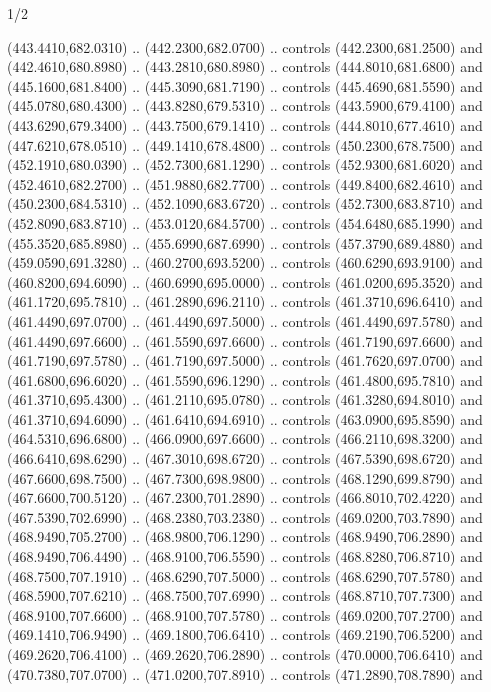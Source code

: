\begin{flagdescription}{1/2}
\begin{scope}[xshift=0.5\flaglength]
\begin{scope}[scale=0.00745\flagwidth,xshift=-12.1mm,yshift=41.7mm]
\begin{scope}[y=0.80pt, x=0.80pt, yscale=-1, xscale=1, inner sep=0pt, outer sep=0pt]
\begin{scope}[cm={{1.33333,0.0,0.0,-1.33333,(0.0,114.66667)}}]
\begin{scope}[scale=0.100]
  (443.4410,682.0310) .. (442.2300,682.0700) .. controls (442.2300,681.2500) and
  (442.4610,680.8980) .. (443.2810,680.8980) .. controls (444.8010,681.6800) and
  (445.1600,681.8400) .. (445.3090,681.7190) .. controls (445.4690,681.5590) and
  (445.0780,680.4300) .. (443.8280,679.5310) .. controls (443.5900,679.4100) and
  (443.6290,679.3400) .. (443.7500,679.1410) .. controls (444.8010,677.4610) and
  (447.6210,678.0510) .. (449.1410,678.4800) .. controls (450.2300,678.7500) and
  (452.1910,680.0390) .. (452.7300,681.1290) .. controls (452.9300,681.6020) and
  (452.4610,682.2700) .. (451.9880,682.7700) .. controls (449.8400,682.4610) and
  (450.2300,684.5310) .. (452.1090,683.6720) .. controls (452.7300,683.8710) and
  (452.8090,683.8710) .. (453.0120,684.5700) .. controls (454.6480,685.1990) and
  (455.3520,685.8980) .. (455.6990,687.6990) .. controls (457.3790,689.4880) and
  (459.0590,691.3280) .. (460.2700,693.5200) .. controls (460.6290,693.9100) and
  (460.8200,694.6090) .. (460.6990,695.0000) .. controls (461.0200,695.3520) and
  (461.1720,695.7810) .. (461.2890,696.2110) .. controls (461.3710,696.6410) and
  (461.4490,697.0700) .. (461.4490,697.5000) .. controls (461.4490,697.5780) and
  (461.4490,697.6600) .. (461.5590,697.6600) .. controls (461.7190,697.6600) and
  (461.7190,697.5780) .. (461.7190,697.5000) .. controls (461.7620,697.0700) and
  (461.6800,696.6020) .. (461.5590,696.1290) .. controls (461.4800,695.7810) and
  (461.3710,695.4300) .. (461.2110,695.0780) .. controls (461.3280,694.8010) and
  (461.3710,694.6090) .. (461.6410,694.6910) .. controls (463.0900,695.8590) and
  (464.5310,696.6800) .. (466.0900,697.6600) .. controls (466.2110,698.3200) and
  (466.6410,698.6290) .. (467.3010,698.6720) .. controls (467.5390,698.6720) and
  (467.6600,698.7500) .. (467.7300,698.9800) .. controls (468.1290,699.8790) and
  (467.6600,700.5120) .. (467.2300,701.2890) .. controls (466.8010,702.4220) and
  (467.5390,702.6990) .. (468.2380,703.2380) .. controls (469.0200,703.7890) and
  (468.9490,705.2700) .. (468.9800,706.1290) .. controls (468.9490,706.2890) and
  (468.9490,706.4490) .. (468.9100,706.5590) .. controls (468.8280,706.8710) and
  (468.7500,707.1910) .. (468.6290,707.5000) .. controls (468.6290,707.5780) and
  (468.5900,707.6210) .. (468.7500,707.6990) .. controls (468.8710,707.7300) and
  (468.9100,707.6600) .. (468.9100,707.5780) .. controls (469.0200,707.2700) and
  (469.1410,706.9490) .. (469.1800,706.6410) .. controls (469.2190,706.5200) and
  (469.2620,706.4100) .. (469.2620,706.2890) .. controls (470.0000,706.6410) and
  (470.7380,707.0700) .. (471.0200,707.8910) .. controls (471.2890,708.7890) and

\end{scope}
\end{scope}
\end{scope}
\end{scope}
\end{scope}
\end{flagdescription}
